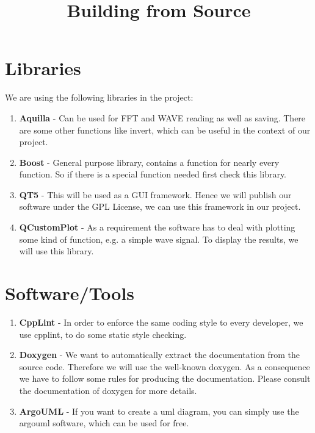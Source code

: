 \documentclass[]{article}
\title{Building from Source}
\author{}
\begin{document}
\section{Libraries}

We are using the following libraries in the project:

\begin{enumerate}
	\item \textbf{Aquilla} - Can be used for FFT and WAVE reading as well as saving. There are some other functions like invert, which can be useful in the context of our project.
	
	\item \textbf{Boost} - General purpose library, contains a function for nearly every function. So if there is a special function needed first check this library.
	
	\item \textbf{QT5} - This will be used as a GUI framework. Hence we will publish our software under the GPL License, we can use this framework in our project.
	
	\item \textbf{QCustomPlot} - As a requirement the software has to deal with plotting some kind of function, e.g. a simple wave signal. To display the results, we will use this library.
	
\end{enumerate}

\section{Software/Tools}

\begin{enumerate}
		
	\item \textbf{CppLint} - In order to enforce the same coding style to every developer, we use cpplint, to do some static style checking.
		
	\item \textbf{Doxygen} - We want to automatically extract the documentation from the source code. Therefore we will use the well-known doxygen. As a consequence we have to follow some rules for producing the documentation. Please consult the documentation of doxygen for more details.
	
	\item \textbf{ArgoUML} - If you want to create a uml diagram, you can simply use the argouml software, which can be used for free.
\end{enumerate}
\end{document}
